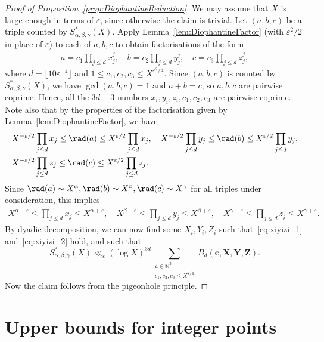 \begin{proof}[Proof of Proposition~\ref{prop:DiophantineReduction}]
  \leanok
  We may assume that $X$ is large enough in terms of $\varepsilon$, since otherwise the claim is trivial. Let $(a,b,c)$ be a triple counted by $S^*_{\alpha,\beta,\gamma}(X)$. Apply Lemma~\ref{lem:DiophantineFactor} (with $\varepsilon^2/2$ in place of $\varepsilon$) to each of $a,b,c$ to obtain factorisations of the form
\begin{align*}
a=c_1\prod_{j\leq d}x_j^j,\quad b=c_2\prod_{j\leq d}y_j^j,\quad c=c_3\prod_{j\leq d}z_j^j,
\end{align*}
where $d=\lfloor 10\varepsilon^{-4}\rfloor$ and $1\leq c_1,c_2,c_3\leq X^{\varepsilon^2/4}$. Since $(a,b,c)$ is counted by $S^*_{\alpha,\beta,\gamma}(X)$, we have $\gcd(a,b,c)=1$ and $a+b=c$, so $a,b,c$ are pairwise coprime. Hence, all the $3d+3$ numbers $x_i,y_i,z_i,c_1,c_2,c_3$ are pairwise coprime. Note also that by the properties of the factorisation given by Lemma~\ref{lem:DiophantineFactor}, we have
\begin{align*}
&X^{-\varepsilon/2}\prod_{j\leq d}x_j\leq \rad(a)\leq X^{\varepsilon/2}\prod_{j\leq d}x_j,\quad X^{-\varepsilon/2}\prod_{j\leq d}y_j\leq \rad(b)\leq X^{\varepsilon/2}\prod_{j\leq d}y_j,\\
&X^{-\varepsilon/2}\prod_{j\leq d}z_j\leq \rad(c)\leq X^{\varepsilon/2}\prod_{j\leq d}z_j.
\end{align*}
Since $\rad(a)\sim X^{\alpha},\rad(b)\sim X^{\beta},\rad(c)\sim X^{\gamma}$ for all triples under consideration, this implies
\begin{align*}
X^{\alpha-\varepsilon}\leq \prod_{j\leq d}x_j\leq X^{\alpha+\varepsilon},\quad X^{\beta-\varepsilon}\leq \prod_{j\leq d}y_j\leq X^{\beta+\varepsilon},\quad X^{\gamma-\varepsilon}\leq \prod_{j\leq d}z_j\leq X^{\gamma+\varepsilon}.
\end{align*}
By dyadic decomposition, we can now find some $X_i, Y_i,Z_i$ such that~\eqref{eq:xiyizi_1}
and~\eqref{eq:xiyizi_2}
 hold, and such that
\[
S^*_{\alpha,\beta,\gamma}(X)\ll_{\varepsilon} (\log X)^{3d} \sum_{\substack{\mathbf{c}\in \mathbb{N}^3\\
c_1,c_2,c_3
\leq X^{\varepsilon/4}}}B_d(\mathbf{c},\mathbf{X},\mathbf{Y},\mathbf{Z}).
\]
Now the claim follows from the pigeonhole principle.
\end{proof}



\chapter{Upper bounds for integer points}

